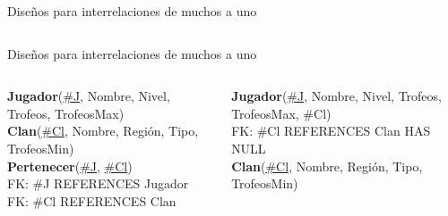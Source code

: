 \begin{frame}{Dise\~nos para interrelaciones de muchos a uno}
\begin{columns}[T]
\begin{column}{0.5\linewidth}
        \end{column}
        
    \end{columns}

\end{frame}


\begin{frame}{Dise\~nos para interrelaciones de muchos a uno}
    \begin{columns}[T]
        \begin{column}{0.48\linewidth}
            \begin{scriptsize}
                \textbf{Jugador}(\underline{\#J}, Nombre, Nivel, Trofeos, TrofeosMax)\\[2mm]
                \textbf{Clan}(\underline{\#Cl}, Nombre, Regi\'on, Tipo, TrofeosMin)\\[2mm]
  
                \textbf{Pertenecer}(\underline{\#J}, \underline{\#Cl})\\[1mm]
                \hspace{4mm} FK: \#J REFERENCES Jugador\\
                \hspace{4mm} FK: \#Cl REFERENCES Clan
            \end{scriptsize}

        \end{column}

        \begin{column}{0.5\linewidth}
            
            \begin{scriptsize}
                \textbf{Jugador}(\underline{\#J}, Nombre, Nivel, Trofeos, TrofeosMax, \#Cl)\\[1mm]
                \hspace{4mm} FK: \#Cl REFERENCES Clan HAS NULL\\[2mm]
                \textbf{Clan}(\underline{\#Cl}, Nombre, Regi\'on, Tipo, TrofeosMin)\\[2mm]
            \end{scriptsize}


\end{column}
\end{columns}
\end{frame}
